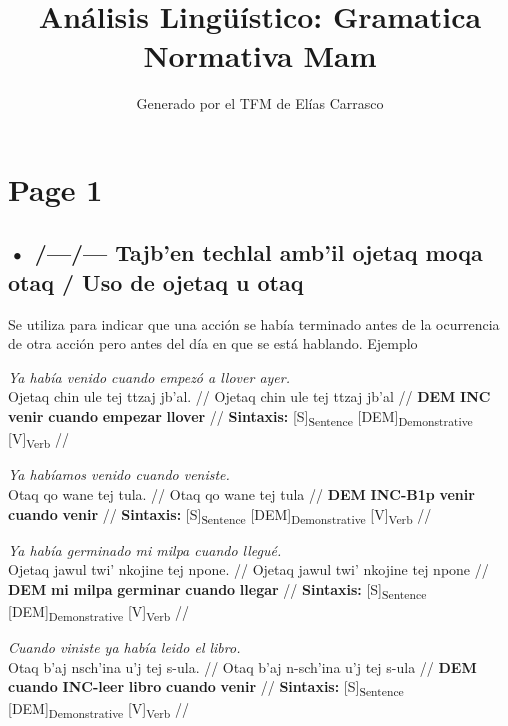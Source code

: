\documentclass{article}%
\title{Análisis Lingüístico: Gramatica Normativa Mam}%
\author{Generado por el TFM de Elías Carrasco}%
\begin{document}
%
\normalsize%
\maketitle%
\section{Page 1}%
\label{sec:Page1}%
\subsection{• /—/— Tajb'en techlal amb'il ojetaq moqa otaq / Uso de ojetaq u otaq}%
\label{subsec://Tajbentechlalambilojetaqmoqaotaq/Usodeojetaquotaq}%

%
Se utiliza para indicar que una acción se había terminado antes %
de la ocurrencia de otra acción pero antes del día en que se %
está hablando. %
Ejemplo %
\par\medskip%
\ex
\textit{Ya había venido cuando empezó a llover ayer.} \\
\begingl
\gla Ojetaq chin ule tej ttzaj jb'al. //
\glb Ojetaq chin ule tej ttzaj jb'al //
\glc \textbf{DEM} \textbf{INC} \textbf{venir} \textbf{cuando} \textbf{empezar} \textbf{llover} //
\glft \textbf{Sintaxis:} [S]\textsubscript{Sentence} [DEM]\textsubscript{Demonstrative} [V]\textsubscript{Verb} //
\endgl
\xe
%
\medskip%
\par\medskip%
\ex
\textit{Ya habíamos venido cuando veniste.} \\
\begingl
\gla Otaq qo wane tej tula. //
\glb Otaq qo wane tej tula //
\glc \textbf{DEM} \textbf{INC-B1p} \textbf{venir} \textbf{cuando} \textbf{venir} //
\glft \textbf{Sintaxis:} [S]\textsubscript{Sentence} [DEM]\textsubscript{Demonstrative} [V]\textsubscript{Verb} //
\endgl
\xe
%
\medskip%
\par\medskip%
\ex
\textit{Ya había germinado mi milpa cuando llegué.} \\
\begingl
\gla Ojetaq jawul twi' nkojine tej npone. //
\glb Ojetaq jawul twi' nkojine tej npone //
\glc \textbf{DEM} \textbf{mi} \textbf{milpa} \textbf{germinar} \textbf{cuando} \textbf{llegar} //
\glft \textbf{Sintaxis:} [S]\textsubscript{Sentence} [DEM]\textsubscript{Demonstrative} [V]\textsubscript{Verb} //
\endgl
\xe
%
\medskip%
\par\medskip%
\ex
\textit{Cuando viniste ya había leido el libro.} \\
\begingl
\gla Otaq b'aj nsch'ina u'j tej s-ula. //
\glb Otaq b'aj n-sch'ina u'j tej s-ula //
\glc \textbf{DEM} \textbf{cuando} \textbf{INC-}\textbf{leer} \textbf{libro} \textbf{cuando} \textbf{venir} //
\glft \textbf{Sintaxis:} [S]\textsubscript{Sentence} [DEM]\textsubscript{Demonstrative} [V]\textsubscript{Verb} //
\endgl
\xe
%
\medskip%
\end{document}

